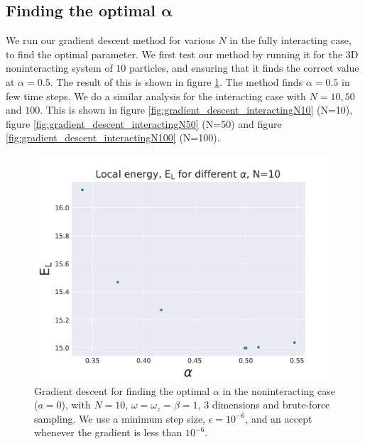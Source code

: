 \documentclass[a4paper, 10pt]{article}
\begin{document}
	\subsection{Finding the optimal $\boldsymbol{\alpha}$}
	We run our gradient descent method for various $N$ in the fully interacting case, to find the optimal parameter. We first test our method by running it for the 3D noninteracting system of $10$ particles, and ensuring that it finds the correct value at $\alpha=0.5$. The result of this is shown in figure \ref{fig:gradient_descent_noninteracting}. 	The method finds $\alpha=0.5$ in few time steps. We do a similar analysis for the interacting case with $N=10,50$ and $100$. This is shown in figure \ref{fig:gradient_descent_interactingN10} (N=10), figure \ref{fig:gradient_descent_interactingN50} (N=50) and figure \ref{fig:gradient_descent_interactingN100} (N=100).
	\pagebreak
			\begin{figure}[ht!]
				\centering
				\includegraphics[scale=0.8]{../Results/Finding_the_optimal_alpha/E_v_alpha_gradient_noninteracting.pdf}
				\caption{Gradient descent for finding the optimal $\alpha$ in the noninteracting case ($a=0$), with $N=10$, $\omega=\omega_z=\beta=1$, 3 dimensions and brute-force sampling. We use a minimum step size, $\epsilon=10^{-6}$, and an accept whenever the gradient is less than $10^{-6}$.}\label{fig:gradient_descent_noninteracting}
			\end{figure}
\end{document}
